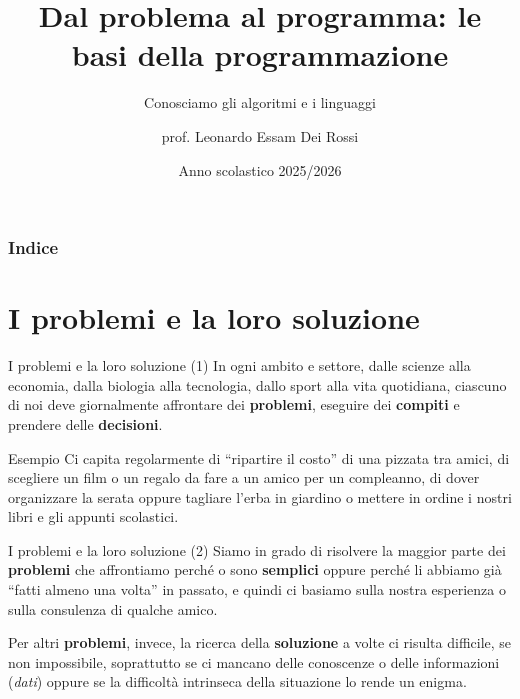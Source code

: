 \documentclass[
    notheorems,
    11pt,
    compress,
    aspectratio=169
]{beamer}
\title[Conosciamo gli algoritmi e i linguaggi]{Dal problema al programma: le basi della programmazione}
\subtitle{Conosciamo gli algoritmi e i linguaggi}
\author{prof. Leonardo Essam Dei Rossi}
\institute[]{ITT "M. Buonarroti" - Trento (TN)}
\date[A.S. 2025/2026]{Anno scolastico 2025/2026}
\begin{document}
\setlength{\baselineskip}{15pt}

\begin{frame}
\titlepage
\end{frame}

\begin{frame}
    \frametitle{Indice}

    \tableofcontents
\end{frame}


\section{I problemi e la loro soluzione}

\begin{frame}{I problemi e la loro soluzione (1)}
    In ogni ambito e settore, dalle scienze alla economia, dalla biologia alla tecnologia, dallo sport alla vita quotidiana, ciascuno di noi deve giornalmente affrontare dei \textbf{problemi}, eseguire dei \textbf{compiti} e prendere delle \textbf{decisioni}.

    \pause
    \vfill
    
    \begin{block}{Esempio}
        Ci capita regolarmente di “ripartire il costo” di una pizzata tra amici, di scegliere un film o un regalo da fare a un amico per un compleanno, di dover organizzare la serata oppure tagliare l’erba in giardino o mettere in ordine i nostri libri e gli appunti scolastici.
    \end{block}
\end{frame}

\begin{frame}{I problemi e la loro soluzione (2)}
    Siamo in grado di risolvere la maggior parte dei \textbf{problemi} che affrontiamo perché o sono \textbf{semplici} oppure perché li abbiamo già “fatti almeno una volta” in passato, e quindi ci basiamo sulla nostra esperienza o sulla consulenza di qualche amico.

    \pause
    \vfill

    Per altri \textbf{problemi}, invece, la ricerca della \textbf{soluzione} a volte ci risulta difficile, se non impossibile, soprattutto se ci mancano delle conoscenze o delle informazioni (\textit{dati}) oppure se la difficoltà intrinseca della situazione lo rende un enigma.
\end{frame}
\end{document}
